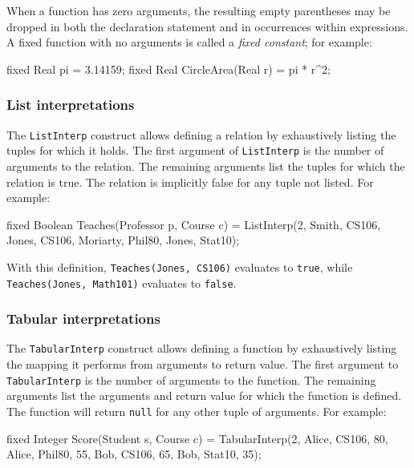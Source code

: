 When a function has zero arguments, the resulting empty parentheses may be dropped
in both the declaration statement and in occurrences within expressions.
A fixed function with no arguments is called a \emph{fixed constant}; for
example:
\begin{blogcode}
fixed Real pi = 3.14159;
fixed Real CircleArea(Real r) = pi * r^2;
\end{blogcode}


\subsubsection{List interpretations}\label{sec:list-interp}

The \verb|ListInterp| construct allows defining a relation by exhaustively
listing the tuples for which it holds. The first argument of \verb|ListInterp|
is the number of arguments to the relation. The remaining arguments list the
tuples for which the relation is true. The relation is implicitly false for any
tuple not listed. For example:

\begin{blogcode}
fixed Boolean Teaches(Professor p, Course c)
    = ListInterp(2, Smith, CS106,
                    Jones, CS106,
                    Moriarty, Phil80,
                    Jones, Stat10);
\end{blogcode}

With this definition, {\tt Teaches(Jones, CS106)} evaluates to \verb|true|,
while {\tt Teaches(Jones, Math101)} evaluates to \verb|false|.


\subsubsection{Tabular interpretations}\label{sec:tabular-interp}

The \verb|TabularInterp| construct allows defining a function by exhaustively
listing the mapping it performs from arguments to return value. The first
argument to \verb|TabularInterp| is the number of arguments to the function.
The remaining arguments list the arguments and return value for which the
function is defined. The function will return \verb|null| for any other tuple
of arguments. For example:

\begin{blogcode}
fixed Integer Score(Student s, Course c)
  = TabularInterp(2, Alice, CS106, 80,
                     Alice, Phil80, 55,
                     Bob, CS106, 65,
                     Bob, Stat10, 35);
\end{blogcode}


